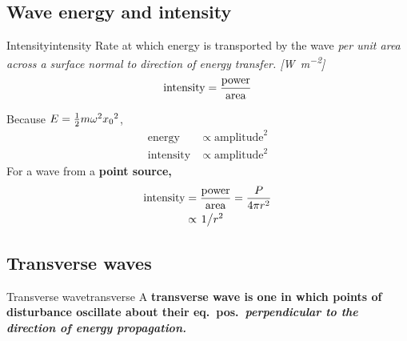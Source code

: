 \subsection{Wave energy and intensity}
\begin{definition}{Intensity}{intensity}
	Rate at which energy is transported by the wave \it{per unit area} across
	a surface normal to direction of energy transfer. [\unit{\watt\per\square\meter}]
	\[\text{intensity} = \frac{\text{power}}{\text{area}}\]
\end{definition}
Because \(E = \frac{1}{2}m\omega^2{x_0}^2\),
\begin{align*}
	\text{energy}    & \propto \text{amplitude}^2 \\
	\text{intensity} & \propto \text{amplitude}^2
\end{align*}
For a wave from a \bf{point source},
\begin{align*}
	\text{intensity} & = \f{\text{power}}{\text{area}} = \f{P}{4\pi r^2} \\
	                 & \propto \lf{1}{r^2}
\end{align*}



\subsection{Transverse waves}
\begin{definition}{Transverse wave}{transverse}
	A \bf{transverse wave} is one in which points of disturbance oscillate about their eq.~pos.~\it{perpendicular}
	to the direction of energy propagation.
\end{definition}

